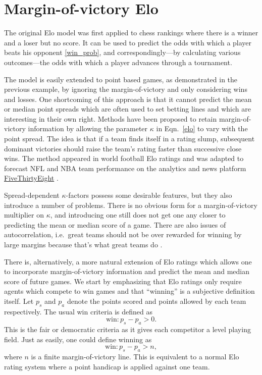 \documentclass[aps,prc,reprint,amsmath,superscriptaddress,nofootinbib]{revtex4-1}
\begin{document}
\section{Margin-of-victory Elo}

The original Elo model was first applied to chess rankings where there is a winner and a loser but no score.
It can be used to predict the odds with which a player beats his opponent \eqref{win_prob}, and correspondingly---by calculating various outcomes---the odds with which a player advances through a tournament. 

The model is easily extended to point based games, as demonstrated in the previous example, by ignoring the margin-of-victory and only considering wins and losses.
One shortcoming of this approach is that it cannot predict the mean or median point spreads which are often used to set betting lines and which are interesting in their own right.
Methods have been proposed to retain margin-of-victory information by allowing the parameter $\kappa$ in Eqn.~\eqref{elo} to vary with the point spread.
The idea is that if a team finds itself in a rating slump, subsequent dominant victories should raise the team's rating faster than successive close wins.
The method appeared in world football Elo ratings \cite{footballratings, elo_blog} and was adapted to forecast NFL and NBA team performance on the analytics and news platform \href{www.fivethirtyeight.com}{FiveThirtyEight} \cite{538NFL, 538NBA}.

Spread-dependent $\kappa$-factors possess some desirable features, but they also introduce a number of problems.
There is no obvious form for a margin-of-victory multiplier on $\kappa$, and introducing one still does not get one any closer to predicting the mean or median score of a game.
There are also issues of autocorrelation, i.e.\ great teams should not be over rewarded for winning by large margins because that's what great teams do \cite{538NFL}.

There is, alternatively, a more natural extension of Elo ratings which allows one to incorporate margin-of-victory information and predict the mean and median score of future games.
We start by emphasizing that Elo ratings only require agents which compete to win games and that ``winning'' is a subjective definition itself.
Let $p_s$ and $p_a$ denote the points scored and points allowed by each team respectively.
The usual win criteria is defined as
\begin{equation}
  \text{win}: p_s - p_a > 0.
\end{equation}
This is the fair or democratic criteria as it gives each competitor a level playing field.
Just as easily, one could define winning as
\begin{equation}
  \text{win}: p_s - p_a > n,
\end{equation}
where $n$ is a finite margin-of-victory line.
This is equivalent to a normal Elo rating system where a point handicap is applied against one team.
\end{document}
